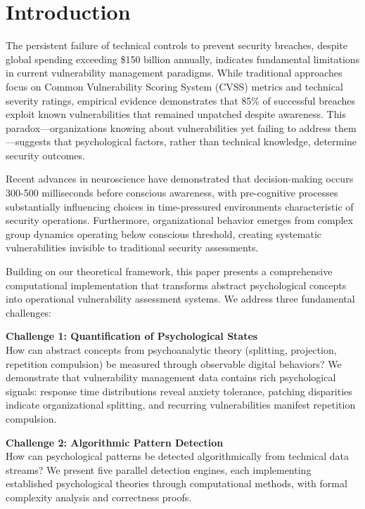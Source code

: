 \documentclass[11pt,a4paper]{article}
\begin{document}
\vspace{1cm}

\section{Introduction}

The persistent failure of technical controls to prevent security breaches, despite global spending exceeding \$150 billion annually\cite{gartner2023}, indicates fundamental limitations in current vulnerability management paradigms. While traditional approaches focus on Common Vulnerability Scoring System (CVSS) metrics and technical severity ratings, empirical evidence demonstrates that 85\% of successful breaches exploit known vulnerabilities that remained unpatched despite awareness\cite{verizon2023}. This paradox—organizations knowing about vulnerabilities yet failing to address them—suggests that psychological factors, rather than technical knowledge, determine security outcomes.

Recent advances in neuroscience have demonstrated that decision-making occurs 300-500 milliseconds before conscious awareness\cite{libet1983, soon2008}, with pre-cognitive processes substantially influencing choices in time-pressured environments characteristic of security operations. Furthermore, organizational behavior emerges from complex group dynamics operating below conscious threshold\cite{bion1961}, creating systematic vulnerabilities invisible to traditional security assessments.

Building on our theoretical framework\cite{canale2025theory}, this paper presents a comprehensive computational implementation that transforms abstract psychological concepts into operational vulnerability assessment systems. We address three fundamental challenges:

\textbf{Challenge 1: Quantification of Psychological States}\\
How can abstract concepts from psychoanalytic theory (splitting, projection, repetition compulsion) be measured through observable digital behaviors? We demonstrate that vulnerability management data contains rich psychological signals: response time distributions reveal anxiety tolerance, patching disparities indicate organizational splitting, and recurring vulnerabilities manifest repetition compulsion.

\textbf{Challenge 2: Algorithmic Pattern Detection}\\
How can psychological patterns be detected algorithmically from technical data streams? We present five parallel detection engines, each implementing established psychological theories through computational methods, with formal complexity analysis and correctness proofs.
\end{document}
